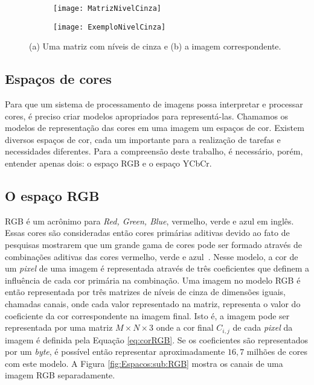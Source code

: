 \begin{figure}
 \centering
\begin{subfigure}{.5\textwidth}
  \centering
  \texttt{[image: MatrizNivelCinza]}
  \caption{}
  \label{exemplo:sfig1}
  \centering
\end{subfigure}%
\begin{subfigure}{.5\textwidth}
  \centering
  \texttt{[image: ExemploNivelCinza]}
  \caption{}
  \label{exemplo:sfig2}
  \centering
\end{subfigure}
\caption{(a) Uma matriz com níveis de cinza e (b) a imagem correspondente.}
\label{fig:NivelCinza}
\centering
\end{figure}


\subsection{Espaços de cores}

Para que um sistema de processamento de imagens possa interpretar e processar cores, é preciso criar modelos apropriados para representá-las. Chamamos os modelos de representação das cores em uma imagem um espaços de cor. Existem diversos espaços de cor, cada um importante para a realização de tarefas e necessidades diferentes. Para a compreensão deste trabalho, é necessário, porém, entender apenas dois: o espaço RGB e o espaço YCbCr.

\subsection{O espaço RGB}


RGB é um acrônimo para \textit{Red, Green, Blue}, vermelho, verde e azul em inglês. Essas cores são consideradas então cores primárias aditivas devido ao fato de pesquisas mostrarem que um grande gama de cores pode ser formado através de combinações aditivas das cores vermelho, verde e azul~\cite{IBGE2000introducao}. Nesse modelo, a cor de um \textit{pixel} de uma imagem é representada através de três coeficientes que definem a influência de cada cor primária na combinação. Uma imagem no modelo RGB é então representada por três matrizes de níveis de cinza de dimensões iguais, chamadas canais, onde cada valor representado na matriz, representa o valor do coeficiente da cor correspondente na imagem final. Isto é, a imagem pode ser representada por uma matriz $M\times N\times 3$ onde a cor final $C_{i,j}$ de cada \textit{pixel} da imagem é definida pela Equação \ref{eq:corRGB}. Se os coeficientes são representados por um \textit{byte}, é possível então representar aproximadamente $16,7$ milhões de cores com este modelo. A Figura \ref{fig:Espacos:sub:RGB} mostra os canais de uma imagem RGB separadamente.

